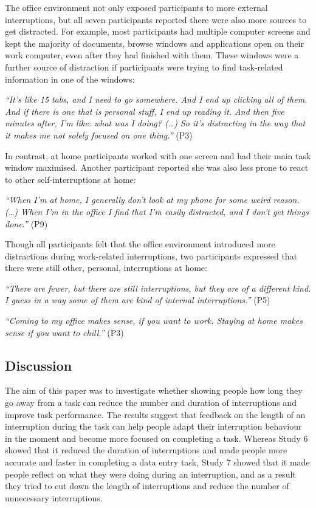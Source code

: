 The office environment not only exposed participants to more external interruptions, but all seven participants reported there were also more sources to get distracted. For example, most participants had multiple computer screens and kept the majority of documents, browse windows and applications open on their work computer, even after they had finished with them. These windows were a further source of distraction if participants were trying to find task-related information in one of the windows:

\textit{“It’s like 15 tabs, and I need to go somewhere. And I end up clicking all of them. And if there is one that is personal stuff, I end up reading it. And then five minutes after, I’m like: what was I doing? (…) So it’s distracting in the way that it makes me not solely focused on one thing.”} (P3)

In contrast, at home participants worked with one screen and had their main task window maximised. Another participant reported she was also less prone to react to other self-interruptions at home:

\textit{“When I’m at home, I generally don’t look at my phone for some weird reason. (…) When I’m in the office I find that I’m easily distracted, and I don’t get things done.”} (P9)

Though all participants felt that the office environment introduced more distractions during work-related interruptions, two participants expressed that there were still other, personal, interruptions at home:

\textit{“There are fewer, but there are still interruptions, but they are of a different kind. I guess in a way some of them are kind of internal interruptions.”} (P5)

\textit{“Coming to my office makes sense, if you want to work. Staying at home makes sense if you want to chill.”} (P3)

\subsection{Discussion}
The aim of this paper was to investigate whether showing people how long they go away from a task can reduce the number and duration of interruptions and improve task performance. The results suggest that feedback on the length of an interruption during the task can help people adapt their interruption behaviour in the moment and become more focused on completing a task. Whereas Study 6 showed that it reduced the duration of interruptions and made people more accurate and faster in completing a data entry task, Study 7 showed that it made people reflect on what they were doing during an interruption, and as a result they tried to cut down the length of interruptions and reduce the number of unnecessary interruptions.

